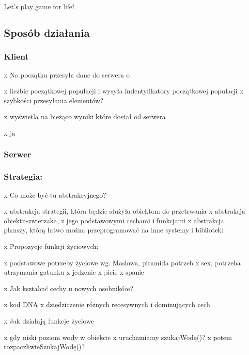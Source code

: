 Let's play game for life!

\subsection*{Sposób działania}

\subsubsection*{Klient}

x Na początku przesyła dane do serwera o \begin{DoxyVerb}    x liczbie początkowej populacji i wysyła indentyfikatory początkowej populacji
    x szybkości przesyłania elementów?
\end{DoxyVerb}


x wyświetla na bieżąco wyniki które dostał od serwera \begin{DoxyVerb}    x ja
\end{DoxyVerb}


\subsubsection*{Serwer}

\subsubsection*{Strategia\-:}

x Co może być tu abstrakcyjnego? \begin{DoxyVerb}    x abstrakcja strategii, która będzie służyła obiektom do przetrwania
    x abstrakcja obiektu-zwierzaka, z jego podstawowymi cechami i funkcjami
    x abstrakcja planszy, którą łatwo można przeprogramować na inne systemy i biblioteki
\end{DoxyVerb}


x Propozycje funkcji życiowych\-: \begin{DoxyVerb}    x podstawowe potrzeby życiowe wg. Maslowa, piramida potrzeb    
    x sex, potrzeba utrzymania gatunku
    x jedzenie
    x picie
    x spanie
\end{DoxyVerb}


x Jak kształcić cechy u nowych osobnikóœ? \begin{DoxyVerb}    x kod DNA
    x dziedziczenie różnych recesywnych i dominujących cech
\end{DoxyVerb}


x Jak działają funkcje życiowe \begin{DoxyVerb}    x gdy niski poziom wody w obiekcie
            x uruchamiamy szukajWodę()?
                    x potem rozpaczliwieSzukajWodę()?
\end{DoxyVerb}


